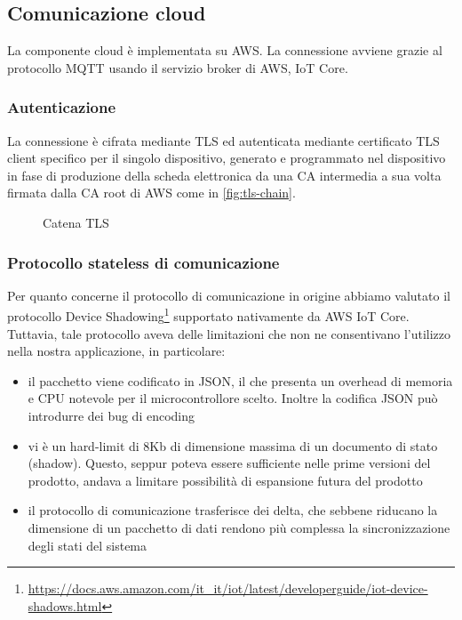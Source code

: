 \documentclass[12pt,a4paper,twoside,titlepage]{book}
\begin{document}
\subsection{Comunicazione cloud}

La componente cloud è implementata su AWS. La connessione avviene grazie al protocollo
MQTT usando il servizio broker di AWS, IoT Core.

\subsubsection{Autenticazione}
La connessione è cifrata mediante TLS ed autenticata mediante certificato TLS client
specifico per il singolo dispositivo, generato e programmato nel dispositivo in fase
di produzione della scheda elettronica da una CA intermedia a sua volta firmata dalla
CA root di AWS come in \autoref{fig:tls-chain}.

\begin{figure}[ht]
    \centering
    \caption{Catena TLS}
    \label{fig:tls-chain}
\end{figure}

\subsubsection{Protocollo stateless di comunicazione}
Per quanto concerne il protocollo di comunicazione in origine abbiamo valutato il
protocollo Device Shadowing\footnote{\url{https://docs.aws.amazon.com/it\_it/iot/latest/developerguide/iot-device-shadows.html}} supportato nativamente da AWS IoT Core. Tuttavia, tale
protocollo aveva delle limitazioni che non ne consentivano l'utilizzo nella nostra
applicazione, in particolare:

\begin{itemize}
    \item il pacchetto viene codificato in JSON, il che presenta un overhead di memoria
        e CPU notevole per il microcontrollore scelto. Inoltre la codifica JSON può
        introdurre dei bug di encoding
    \item vi è un hard-limit di 8Kb di dimensione massima di un documento di stato (shadow).
        Questo, seppur poteva essere sufficiente nelle prime versioni del prodotto, andava
        a limitare possibilità di espansione futura del prodotto
    \item il protocollo di comunicazione trasferisce dei delta, che sebbene riducano la
        dimensione di un pacchetto di dati rendono più complessa la sincronizzazione degli
        stati del sistema
\end{itemize}
\end{document}
